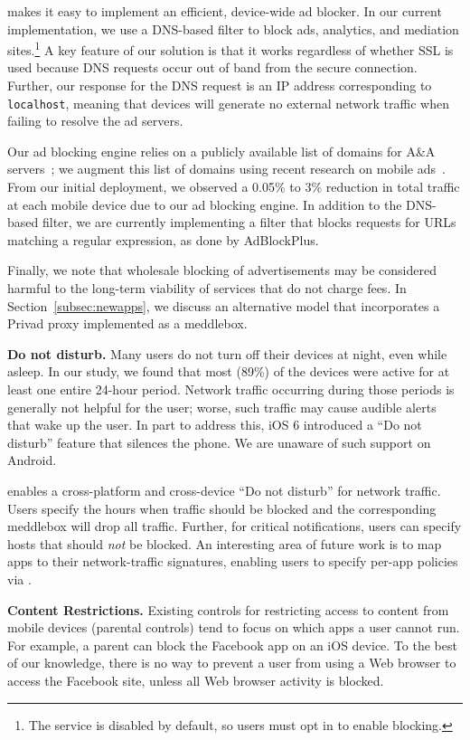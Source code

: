 \meddle makes it easy to implement an efficient, device-wide ad blocker. 
In our current implementation, we use a DNS-based filter to
block ads, analytics, and mediation sites.\footnote{The service is disabled by default, so users must 
opt in to enable blocking.} A key feature of our solution is that it works 
regardless of whether SSL is used because DNS requests occur out of band 
from the secure connection. Further, our response for the DNS request is an IP address corresponding to {\tt localhost}, 
meaning that devices will generate no external network traffic when failing 
to resolve the ad servers. 


Our ad blocking engine relies on a publicly available list of domains for A\&A servers~\cite{YoyoAds}; we augment this list of domains using 
recent research on mobile ads~\cite{hornyack:appfence,
  Leontiadis:2012:AdsMobile}. From our initial deployment, we observed a 0.05\% to 3\% reduction
in total traffic at each mobile device due to our ad blocking engine. 
In addition to the DNS-based filter, we are currently implementing a filter that blocks 
requests for URLs matching a regular expression, as done by AdBlockPlus.

Finally, we note that wholesale blocking of advertisements may be considered harmful 
to the long-term viability of services that do not charge fees. In Section~\ref{subsec:newapps}, 
we discuss an alternative model that incorporates a Privad proxy implemented as a meddlebox. 

\noindent\textbf{Do not disturb.} 
Many users do not turn off their devices at night, even while asleep. In our study, we found that 
most (89\%) of the devices were active for at least one entire 24-hour period. Network 
traffic occurring during those periods is generally not helpful for the user; worse, 
such traffic may cause audible alerts that wake up the user. In part to address this, 
iOS 6 introduced a ``Do not disturb'' feature that silences the phone. We are unaware of such support on Android.

\meddle enables a cross-platform and cross-device ``Do not disturb'' for network 
traffic. Users specify the hours when traffic should be blocked and the corresponding 
meddlebox will drop all traffic. Further, for critical notifications, users can specify hosts that should \emph{not} be 
blocked. An interesting area of future work is to map apps to their network-traffic 
signatures, enabling users to specify per-app policies via \meddle.

\noindent\textbf{Content Restrictions.} 
Existing controls for restricting access to content from mobile devices (\eg parental controls) 
tend to focus on which apps a user cannot run. For example, a parent can block the Facebook app on an iOS device. 
To the best of our knowledge, there is no way to prevent a user from using a 
Web browser to access the Facebook site, unless all Web browser activity is blocked. 

